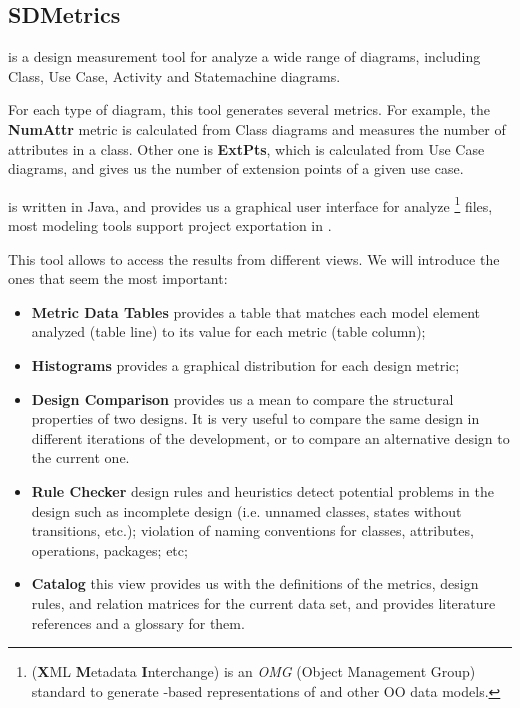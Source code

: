 \subsection{SDMetrics}
\sdmetricsS is a design measurement tool for analyze a wide range of \umlS diagrams, including Class, Use Case, Activity and Statemachine diagrams.

For each type of diagram, this tool generates several metrics.
For example, the \textbf{NumAttr} metric is calculated from Class diagrams and measures the number of attributes in a class.
Other one is \textbf{ExtPts}, which is calculated from Use Case diagrams, and gives us the number of extension points of a given use case.

\sdmetricsS is written in \textsf{Java}, and provides us a graphical user interface for analyze \xmi\footnote{
\xmi (\textbf{X}ML \textbf{M}etadata \textbf{I}nterchange)  is an \textit{OMG} (Object Management Group) standard to generate \xml -based representations of \umlS and other OO data models.} 
files, most modeling tools support project exportation in \xmi.

This tool allows to access the results from different views. We will introduce the ones that seem the most important:
\begin{itemize}
\item \textbf{Metric Data Tables} provides a table that matches each \umlS model element analyzed (table line) to its value for each metric (table column);
\item \textbf{Histograms} provides a graphical distribution  for each design metric;
\item \textbf{Design Comparison} provides us a mean to compare the structural properties of two \umlS designs. It is very useful to compare the same design in different iterations of the development, or to compare an alternative design to the current one.
\item \textbf{Rule Checker} design rules and heuristics detect potential problems in the \umlS design such as incomplete design (i.e. unnamed classes, states without transitions, etc.);  violation of naming conventions for classes, attributes, operations, packages; etc;

\item \textbf{Catalog} this view provides us with the definitions of the metrics, design rules, and relation matrices for the current data set, and provides literature references and a glossary for them.
\end{itemize}

